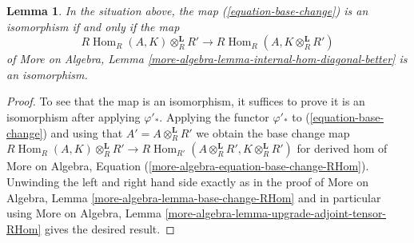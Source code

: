 \documentclass[10pt,a4paper]{amsart}
\theoremstyle{plain}
\newtheorem{lemma}[subsection]{Lemma}
\theoremstyle{definition}
\theoremstyle{remark}
\numberwithin{equation}{subsection}
\def\Hom{\mathop{\mathrm{Hom}}\nolimits}
\begin{document}
\begin{lemma}
\label{lemma-check-base-change-is-iso}
In the situation above, the map (\ref{equation-base-change})
is an isomorphism if and only if the map
$$
R\Hom_R(A, K) \otimes_R^\mathbf{L} R'
\longrightarrow
R\Hom_R(A, K \otimes_R^\mathbf{L} R')
$$
of More on Algebra, Lemma
\ref{more-algebra-lemma-internal-hom-diagonal-better} is an isomorphism.
\end{lemma}

\begin{proof}
To see that the map is an isomorphism, it suffices to prove it
is an isomorphism after applying $\varphi'_*$.
Applying the functor $\varphi'_*$ to (\ref{equation-base-change})
and using that $A' = A \otimes_R^\mathbf{L} R'$
we obtain the base change map
$R\Hom_R(A, K) \otimes_R^\mathbf{L} R' \to
R\Hom_{R'}(A \otimes_R^\mathbf{L} R', K \otimes_R^\mathbf{L} R')$
for derived hom of
More on Algebra, Equation (\ref{more-algebra-equation-base-change-RHom}).
Unwinding the left and right hand side exactly as in the proof of
More on Algebra, Lemma \ref{more-algebra-lemma-base-change-RHom}
and in particular using
More on Algebra, Lemma \ref{more-algebra-lemma-upgrade-adjoint-tensor-RHom}
gives the desired result.
\end{proof}
\end{document}
